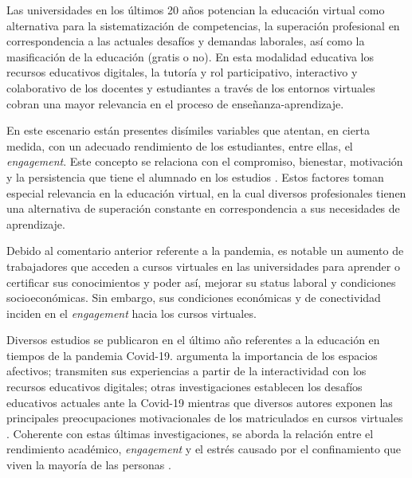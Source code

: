 \documentclass{textolivre}
\begin{document}
Las universidades en los últimos 20 años potencian la educación virtual como alternativa para la sistematización de competencias, la superación profesional en correspondencia a las actuales desafíos y demandas laborales, así como la masificación de la educación (gratis o no). En esta modalidad educativa los recursos educativos digitales, la tutoría y rol participativo, interactivo y colaborativo de los docentes y estudiantes a través de los entornos virtuales cobran una mayor relevancia en el proceso de enseñanza-aprendizaje.

En este escenario están presentes disímiles variables que atentan, en cierta medida, con un adecuado rendimiento de los estudiantes, entre ellas, el \emph{engagement}. Este concepto se relaciona con el compromiso, bienestar, motivación y la persistencia que tiene el alumnado en los estudios \cite{schaufeli2002}. %
Estos factores toman especial relevancia en la educación virtual, en la cual diversos profesionales tienen una alternativa de superación constante en correspondencia a sus necesidades de aprendizaje.

Debido al comentario anterior referente a la pandemia, es notable un aumento de trabajadores que acceden a cursos virtuales en las universidades para aprender o certificar sus conocimientos y poder así, mejorar su status laboral y condiciones socioeconómicas. Sin embargo, sus condiciones económicas y de conectividad inciden en el \emph{engagement} hacia los cursos virtuales.

Diversos estudios se publicaron en el último año referentes a la educación en tiempos de la pandemia Covid-19. \textcite{cacerespinaloza2020} %
argumenta la importancia de los espacios afectivos; \textcite{kemmekah2020, jordan2020, lin2020, hernandezramos2021} %
transmiten sus experiencias a partir de la interactividad con los recursos educativos digitales; otras investigaciones establecen los desafíos educativos actuales ante la Covid-19 \cite{baptistalucio2020, miguel2020, floresnessi2020, velasquez2020, jimenez2021} %
mientras que diversos autores exponen las principales preocupaciones motivacionales de los matriculados en cursos virtuales \cite{diazguillen2018, ojeda2020, valdivieso2020, gonzalez2020}. %
Coherente con estas últimas investigaciones, se aborda la relación entre el rendimiento académico, \emph{engagement} y el estrés causado por el confinamiento que viven la mayoría de las personas \cite{alvarezherrero-hernandez2020, hernandez2020, mahdy2020, valdivieso2020, santiagoiglesias2021}. %
\end{document}
